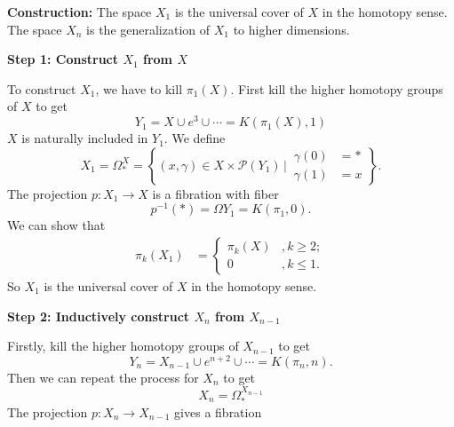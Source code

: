     \textbf{Construction:}
    The space $X_1$ is the universal cover of $X$ in the homotopy sense. 
    The space $X_n$ is the generalization of $X_1$ to higher dimensions. 
    
    \textbf{Step 1: Construct $X_1$ from $X$}
    
    To construct $X_1$, we have to kill $\pi_1(X)$. 
    First kill the higher homotopy groups of $X$ to get
    \begin{equation*}
        Y_1 = X \cup e^3 \cup \cdots = K(\pi_1(X),1)
    \end{equation*}
    $X$ is naturally included in $Y_1$. We define 
    \begin{equation*}
        X_1 = \Omega_{*}^{X} = \left\{(x,\gamma) \in X\times\mathcal{P}(Y_1)
        \,\Bigg|\, 
        \begin{aligned}
            \gamma(0) &= * \\
            \gamma(1) &= x
        \end{aligned}
        \right\}.
    \end{equation*} 
    The projection $p: X_1 \to X$ is a fibration with fiber
    \begin{equation*}
        p^{-1}(*)=\Omega Y_1 = K(\pi_1,0).
    \end{equation*}
    We can show that 
    \begin{align*}
        \pi_k(X_1) &= 
        \begin{cases}
            \pi_k(X) &, k\geq 2; \\
            0 &, k\leq 1. 
        \end{cases}
    \end{align*}
    So $X_1$ is the universal cover of $X$ in the homotopy sense.

    \textbf{Step 2: Inductively construct $X_n$ from $X_{n-1}$}

    Firstly, kill the higher homotopy groups of $X_{n-1}$ to get
    \begin{equation*}
        Y_n = X_{n-1} \cup e^{n+2} \cup \cdots = K(\pi_n,n).
    \end{equation*}
    Then we can repeat the process for $X_n$ to get
    \begin{equation*}
        X_n = \Omega_{*}^{X_{n-1}}
    \end{equation*}
    The projection $p: X_n \to X_{n-1}$ gives a fibration 
    \begin{center}
    \end{center}

